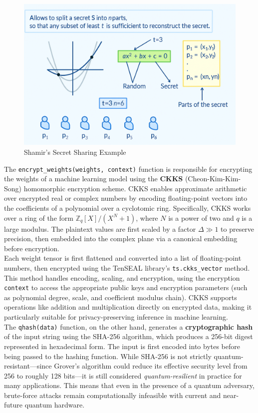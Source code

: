 \documentclass[10pt]{article}
\begin{document}
\begin{figure}[h!]
	\centering
	\includegraphics[height = 0.25\textheight]{img/QFL_code/SSS.png}
	\caption{Shamir's Secret Sharing Example}
\end{figure}

\noindent The \texttt{encrypt\_weights(weights, context)} function is responsible for encrypting the weights of a machine learning model using the \textbf{CKKS} (Cheon-Kim-Kim-Song) homomorphic encryption scheme. CKKS enables approximate arithmetic over encrypted real or complex numbers by encoding floating-point vectors into the coefficients of a polynomial over a cyclotomic ring. Specifically, CKKS works over a ring of the form \( \mathbb{Z}_q[X]/(X^N + 1) \), where \( N \) is a power of two and \( q \) is a large modulus. The plaintext values are first scaled by a factor \( \Delta \gg 1 \) to preserve precision, then embedded into the complex plane via a canonical embedding before encryption.\\
Each weight tensor is first flattened and converted into a list of floating-point numbers, then encrypted using the TenSEAL library's \texttt{ts.ckks\_vector} method. This method handles encoding, scaling, and encryption, using the encryption \texttt{context} to access the appropriate public keys and encryption parameters (such as polynomial degree, scale, and coefficient modulus chain). CKKS supports operations like addition and multiplication directly on encrypted data, making it particularly suitable for privacy-preserving inference in machine learning.\\
The \texttt{qhash(data)} function, on the other hand, generates a \textbf{cryptographic hash} of the input string using the SHA-256 algorithm, which produces a 256-bit digest represented in hexadecimal form. The input is first encoded into bytes before being passed to the hashing function. While SHA-256 is not strictly quantum-resistant—since Grover’s algorithm could reduce its effective security level from 256 to roughly 128 bits—it is still considered \emph{quantum-resilient} in practice for many applications. This means that even in the presence of a quantum adversary, brute-force attacks remain computationally infeasible with current and near-future quantum hardware.
\end{document}
